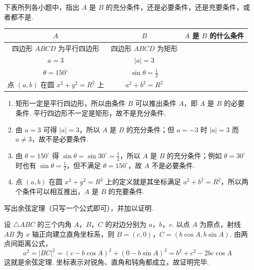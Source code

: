 \documentclass[UTF8,a4paper,oneside,11pt]{ctexbook}
\begin{document}
\begin{problem}
下表所列各小题中，指出 \(A\) 是 \(B\) 的充分条件，还是必要条件，还是充要条件，或者都不是.

\begin{center}
\renewcommand{\arraystretch}{1.25}
\setlength{\tabcolsep}{8pt}
\begin{tabular}{|c|c|c|}
\hline
\(A\) & \(B\) & \(A\) 是 \(B\) 的什么条件 \\
\hline
四边形 \(ABCD\) 为平行四边形 & 四边形 \(ABCD\) 为矩形 & \\
\hline
\(a=3\) & \(|a|=3\) & \\
\hline
\(\theta=150^\circ\) & \(\sin\theta=\frac{1}{2}\) & \\
\hline
点 \((a,b)\) 在圆 \(x^{2}+y^{2}=R^{2}\) 上 & \(a^{2}+b^{2}=R^{2}\) & \\
\hline
\end{tabular}
\end{center}
\end{problem}

\begin{solution}
\begin{enumerate}
\item 矩形一定是平行四边形，所以由条件 \(B\) 可以推出条件 \(A\)，即 \(A\) 是 \(B\) 的必要条件. 平行四边形不一定是矩形，故不是充分条件.
\item 由 \(a=3\) 可得 \(|a|=3\)，所以 \(A\) 是 \(B\) 的充分条件；但 \(a=-3\) 时 \(|a|=3\) 而 \(a\ne3\)，故不是必要条件.
\item 由 \(\theta=150^\circ\) 得 \(\sin\theta=\sin30^\circ=\frac{1}{2}\)，所以 \(A\) 是 \(B\) 的充分条件；例如 \(\theta=30^\circ\) 时也有 \(\sin\theta=\frac{1}{2}\)，但不满足 \(\theta=150^\circ\)，故 \(A\) 不是必要条件.
\item 点 \((a,b)\) 在圆 \(x^2+y^2=R^2\) 上的定义就是其坐标满足 \(a^2+b^2=R^2\)，所以两个条件可以相互推出，\(A\) 是 \(B\) 的充要条件.
\end{enumerate}
\end{solution}

\begin{problem}
写出余弦定理（只写一个公式即可），并加以证明.
\end{problem}

\begin{solution}
设 \(\triangle ABC\) 的三个内角 \(A\)，\(B\)，\(C\) 的对边分别为 \(a\)，\(b\)，\(c\). 以点 \(A\) 为原点，射线 \(AB\) 为 \(x\) 轴正向建立直角坐标系，则
\(B=(c,0)\)，\(C=(b\cos A,b\sin A)\). 由两点间距离公式，
\[
a^2=|BC|^2=(c-b\cos A)^2+(0-b\sin A)^2=b^2+c^2-2bc\cos A
\]
这就是余弦定理. 坐标表示对锐角、直角和钝角都成立，故证明完毕.
\end{solution}
\end{document}
